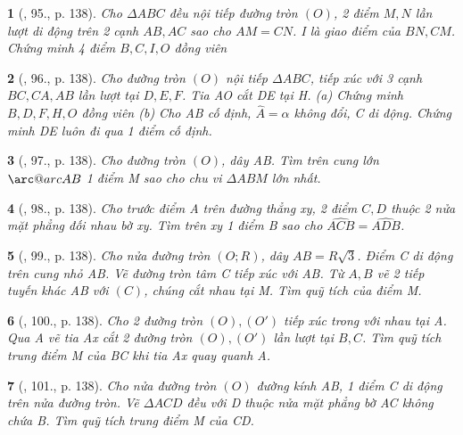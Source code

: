 \documentclass{article}
\makeatletter
\newcommand{\arc@char}{{\usefont{U}{tipa}{m}{n}\symbol{62}}}%
\newcommand{\arc}[1]{\mathpalette\arc@arc{#1}}
\newcommand{\arc@arc}[2]{%
	\sbox0{$\m@th#1#2$}%
	\vbox{
		\hbox{\resizebox{\wd0}{\height}{\arc@char}}
		\nointerlineskip
		\box0
	}%
}
\newtheorem{baitoan}{}
\makeatother
\begin{document}
\begin{baitoan}[\cite{Tuyen_Toan_9_old}, 95., p. 138]
	Cho $\Delta ABC$ đều nội tiếp đường tròn $(O)$, 2 điểm $M,N$ lần lượt di động trên 2 cạnh $AB,AC$ sao cho $AM = CN$. I là giao điểm của $BN,CM$. Chứng minh 4 điểm $B,C,I,O$ đồng viên
\end{baitoan}

\begin{baitoan}[\cite{Tuyen_Toan_9_old}, 96., p. 138]
	Cho đường tròn $(O)$ nội tiếp $\Delta ABC$, tiếp xúc với 3 cạnh $BC,CA,AB$ lần lượt tại $D,E,F$. Tia AO cắt DE tại H. (a) Chứng minh $B,D,F,H,O$ đồng viên (b) Cho AB cố định, $\widehat{A} = \alpha$ không đổi, C di động. Chứng minh DE luôn đi qua 1 điểm cố định.
\end{baitoan}

\begin{baitoan}[\cite{Tuyen_Toan_9_old}, 97., p. 138]
	Cho đường tròn $(O)$, dây AB. Tìm trên cung lớn $\arc{AB}$ 1 điểm M sao cho chu vi $\Delta ABM$ lớn nhất.
\end{baitoan}

\begin{baitoan}[\cite{Tuyen_Toan_9_old}, 98., p. 138]
	Cho trước điểm A trên đường thẳng xy, 2 điểm $C,D$ thuộc 2 nửa mặt phẳng đối nhau bờ xy. Tìm trên xy 1 điểm B sao cho $\widehat{ACB} = \widehat{ADB}$.
\end{baitoan}

\begin{baitoan}[\cite{Tuyen_Toan_9_old}, 99., p. 138]
	Cho nửa đường tròn $(O;R)$, dây $AB = R\sqrt{3}$. Điểm C di động trên cung nhỏ AB. Vẽ đường tròn tâm C tiếp xúc với AB. Từ $A,B$ vẽ 2 tiếp tuyến khác AB với $(C)$, chúng cắt nhau tại M. Tìm quỹ tích của điểm M.
\end{baitoan}

\begin{baitoan}[\cite{Tuyen_Toan_9_old}, 100., p. 138]
	Cho 2 đường tròn $(O),(O')$ tiếp xúc trong với nhau tại A. Qua A vẽ tia Ax cắt 2 đường tròn $(O),(O')$ lần lượt tại $B,C$. Tìm quỹ tích trung điểm M của BC khi tia Ax quay quanh A.
\end{baitoan}

\begin{baitoan}[\cite{Tuyen_Toan_9_old}, 101., p. 138]
	Cho nửa đường tròn $(O)$ đường kính AB, 1 điểm C di động trên nửa đường tròn. Vẽ $\Delta ACD$ đều với D thuộc nửa mặt phẳng bờ AC không chứa B. Tìm quỹ tích trung điểm M của CD.
\end{baitoan}
\end{document}
